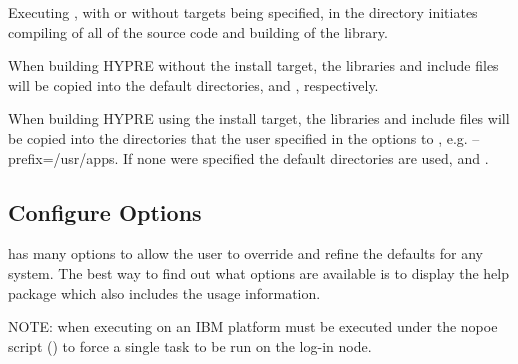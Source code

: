 Executing , with or without targets being specified, in the  directory 
initiates compiling of all of the source code and building of the \hypre{} library. 

When building HYPRE without the install target, the libraries and include files will be copied
into the default directories,  and
, respectively.

When building HYPRE using the install target, the libraries and include files will be copied
into the directories that the user specified in the options to ,
e.g. --prefix=/usr/apps.  If none were specified the default directories are used,
 and .

\subsection{Configure Options}
\label{Configure Options}

 has many options to allow the user to override and refine the 
defaults for any system. The best way to find out what options are available is
to display the help package which also includes the usage information.

NOTE: when executing on an IBM platform  must be executed under 
the nopoe script () to force a single 
task to be run on the log-in node.

